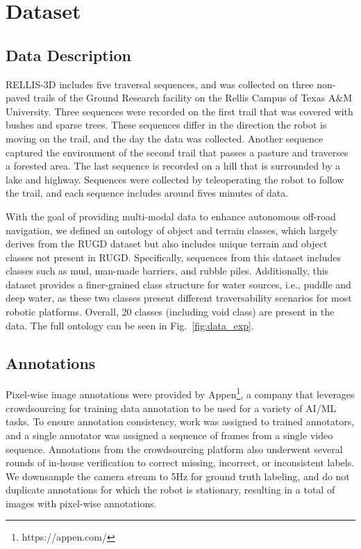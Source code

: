 \documentclass[letterpaper, 10 pt, conference]{ieeeconf}
\begin{document}
\section{Dataset}
\subsection{Data Description}
RELLIS-3D includes five traversal sequences, and was collected on three non-paved trails of the Ground Research facility on the Rellis Campus of Texas A\&M University. Three sequences were recorded on the first trail that was covered with bushes and sparse trees. These sequences differ in the direction the robot is moving on the trail, and the day the data was collected. Another sequence captured the environment of the second trail that passes a pasture and traverses a forested area. The last sequence is recorded on a hill that is surrounded by a lake and highway. Sequences were collected by teleoperating the robot to follow the trail, and each sequence includes around fives minutes of data.

With the goal of providing multi-modal data to enhance autonomous off-road navigation, we defined an ontology of object and terrain classes, which largely derives from the RUGD dataset \cite{RUGD2019IROS} but also includes unique terrain and object classes not present in RUGD. Specifically, sequences from this dataset includes classes such as mud, man-made barriers, and rubble piles. Additionally, this dataset provides a finer-grained class structure for water sources, i.e., puddle and deep water, as these two classes present different traversability scenarios for most robotic platforms. Overall, 20 classes (including void class) are present in the data. The full ontology can be seen in Fig.~\ref{fig:data_exp}. \subsection{Annotations}
Pixel-wise image annotations were provided by Appen\footnote{https://appen.com/}, a company that leverages crowdsourcing for training data annotation to be used for a variety of AI/ML tasks. To ensure annotation consistency, work was assigned to trained annotators, and a single annotator was assigned a sequence of frames from a single video sequence. Annotations from the crowdsourcing platform also underwent several rounds of in-house verification to correct missing, incorrect, or inconsistent labels. We downsample the camera stream to 5Hz for ground truth labeling, and do not duplicate annotations for which the robot is stationary, resulting in a total of  images with pixel-wise annotations.
\end{document}
